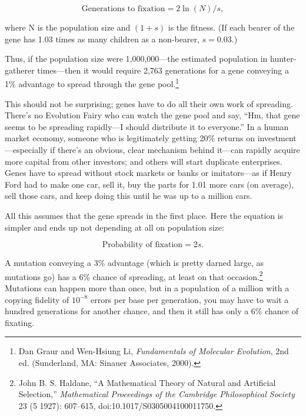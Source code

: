 \begin{equation*}
 \text{Generations to fixation} = 2 \ln(N) / s,
\end{equation*}



 where N is the population size and $(1 + s)$ is the fitness. (If
each bearer of the gene has 1.03 times as many children as a
non-bearer, $s = 0.03$.) 

{
 Thus, if the population size were 1,000,000---the estimated
population in hunter-gatherer times---then it would require 2,763
generations for a gene conveying a 1\% advantage to spread through the
gene pool.\footnote{Dan Graur and Wen-Hsiung Li, \textit{Fundamentals of Molecular
Evolution}, 2nd ed. (Sunderland, MA: Sinauer Associates, 2000).}}


 This should not be surprising; genes have to do all their own work
of spreading. There's no Evolution Fairy who can watch
the gene pool and say, ``Hm, that gene seems to be
spreading rapidly---I should distribute it to
everyone.'' In a human market economy, someone who is
legitimately getting 20\% returns on investment---especially if
there's an obvious, clear mechanism behind it---can
rapidly acquire more capital from other investors; and others will
start duplicate enterprises. Genes have to spread without stock markets
or banks or imitators---as if Henry Ford had to make one car, sell it,
buy the parts for 1.01 more cars (on average), sell those cars, and
keep doing this until he was up to a million cars.


 All this assumes that the gene spreads in the first place. Here
the equation is simpler and ends up not depending at all on population
size:

\begin{equation*}
\text{Probability of fixation} = 2s.
\end{equation*}



 A mutation conveying a 3\% advantage (which is pretty darned
large, as mutations go) has a 6\% chance of spreading, at least on that
occasion.\footnote{John B. S. Haldane, ``A Mathematical Theory of
Natural and Artificial Selection,''
\textit{Mathematical Proceedings of the Cambridge Philosophical
Society} 23 (5 1927): 607--615, doi:10.1017/S0305004100011750.} Mutations can happen more than once, but
in a population of a million with a copying fidelity of
$10^{-8}$ errors per base per generation, you may have
to wait a hundred generations for another chance, and then it still has
only a 6\% chance of fixating. 


